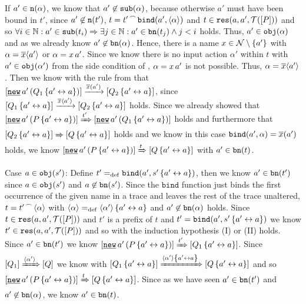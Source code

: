 \begin{prf}
\begin{description}
\begin{description}
If $a'\in\mathtt{n}(\alpha)$, we know that $a'\not\in\mathtt{sub}(\alpha)$, because otherwise $a'$ must have been bound in $t'$, since $a'\not\in\mathtt{n}(t')$, $t={t'}^{\,\frown{}\,}{\mathtt{bind}(a',\langle\alpha\rangle)}$ and $t\in\res{a}{a'}{P}$ and so $\forall{}i\in\mathbb N: a'\in\mathtt{sub}(t_i) \Rightarrow \exists{}j\in\mathbb N: a'\in\mathtt{bn}(t_j)\wedge{}j<i$ holds. Thus, $a'\in\mathtt{obj}(\alpha)$ and as we already know $a'\not\in\mathtt{bn}(\alpha)$. Hence, there is a name $x\in\names\setminus\set{a'}$ with $\alpha=\overline{x}\langle a'\rangle$ or $\alpha=x\,a'$. Since we know there is no input action $\alpha'$ within $t$ with $a'\in\mathtt{obj}(\alpha')$ from the side condition of , $\alpha=x\,a'$ is not possible. Thus, $\alpha=\overline{x}\langle a'\rangle$. Then we know with the \eopen{} rule from  that $\ec{\procres[()]{a'}{Q_1\transp{a'}{a}}}\transs{\bout{x}{a'}}\ec{Q_2\transp{a'}{a}}$, since $\left[Q_1\left\{a'\leftrightarrow{}a\right\}\right]\xrightarrow{\overline{x}\langle a'\rangle}\left[Q_2\left\{a'\leftrightarrow{}a\right\}\right]$ holds. Since we already showed that $\ec{\procres[()]{a'}{P\transp{a'}{a}}}\bigstep{t'}\ec{\procres[()]{a'}{Q_1\transp{a'}{a}}}$ holds and furthermore that $\left[Q_2\left\{a'\leftrightarrow{}a\right\}\right]\xRightarrow{}\left[Q\left\{a'\leftrightarrow{}a\right\}\right]$ holds and we know in this case $\mathtt{bind}(a',\alpha)=\overline{x}(a')$ holds, we know $\ec{\procres[()]{a'}{P\transp{a'}{a}}}\bigstep{t}\ec{Q\transp{a'}{a}}$ with $a'\in\mathtt{bn}(t)$.
\begin{old}
\item[Case $a\in\mathtt{obj}(s')$:] Define $t'=_{\mathrm{def}}\mathtt{bind}(a',s'\left\{a'\leftrightarrow{}a\right\})$, then we know $a'\in\mathtt{bn}(t')$ since $a\in\mathtt{obj}(s')$ and $a\not\in\mathtt{bn}(s')$. Since the $\texttt{bind}$ function just binds the first occurrence of the given name in a trace and leaves the rest of the trace unaltered, $t={t'}^{\,\frown{}\,}{\langle\alpha\rangle}$ with $\langle\alpha\rangle=_{\mathrm{def}}\langle\alpha'\rangle\left\{a'\leftrightarrow{}a\right\}$ and $a'\not\in\mathtt{bn}(\alpha)$ holds. Since $t\in\res{a}{a'}{P}$ and $t'$ is a prefix of $t$ and $t'=\mathtt{bind}(a',s'\left\{a'\leftrightarrow{}a\right\})$ we know $t'\in\res{a}{a'}{P}$ and so with the induction hypothesis (I) or (II) holds. Since $a'\in\mathtt{bn}(t')$ we know $\ec{\procres[()]{a'}{P\transp{a'}{a}}}\bigstep{t'}\ec{Q_1\transp{a'}{a}}$. Since $\left[Q_1\right]\xRightarrow{\langle\alpha'\rangle}\left[Q\right]$ we know with  $\left[Q_1\left\{a'\leftrightarrow{}a\right\}\right]\xRightarrow{\langle\alpha'\rangle\left\{a'\leftrightarrow{}a\right\}}\left[Q\left\{a'\leftrightarrow{}a\right\}\right]$ and so $\ec{\procres[()]{a'}{P\transp{a'}{a}}}\bigstep{t}\ec{Q\transp{a'}{a}}$. Since as we have seen $a'\in\mathtt{bn}(t')$ and $a'\not\in\mathtt{bn}(\alpha)$, we know $a'\in\mathtt{bn}(t)$.


\end{old}
\end{description}
\end{description}
\end{prf}
